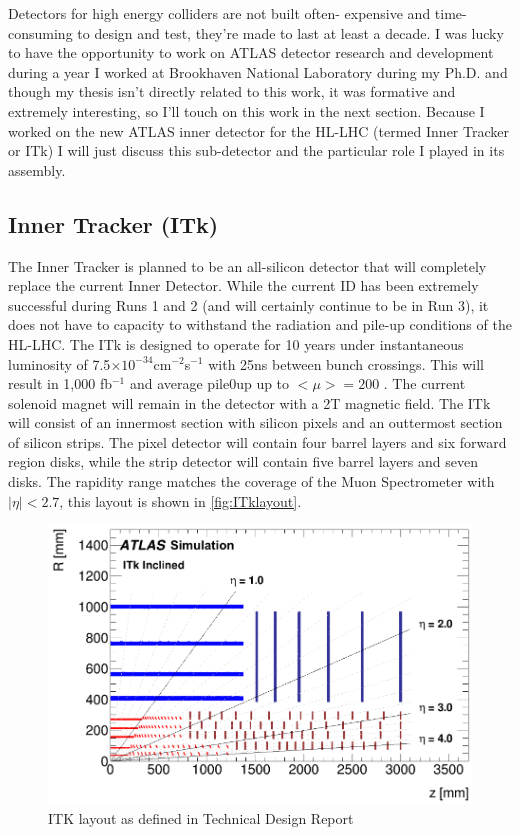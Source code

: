 Detectors for high energy colliders are not built often- expensive and time-consuming to design and test, they're made to last at least a decade. I was lucky to have the opportunity to work on ATLAS detector research and development during a year I worked at Brookhaven National Laboratory during my Ph.D. and though my thesis isn't directly related to this work, it was formative and extremely interesting, so I'll touch on this work in the next section. Because I worked on the new ATLAS inner detector for the HL-LHC (termed Inner Tracker or ITk) I will just discuss this sub-detector and the particular role I played in its assembly.

\subsection{Inner Tracker (ITk)}
The Inner Tracker is planned to be an all-silicon detector that will completely replace the current Inner Detector.  While the current ID has been extremely successful during Runs 1 and 2 (and will certainly continue to be in Run 3), it does not have to capacity to withstand the radiation and pile-up conditions of the HL-LHC. The ITk is designed to operate for 10 years under instantaneous luminosity of 7.5$\times10^{-34}$cm$^{-2}$s$^{-1}$ with 25ns between bunch crossings. This will result in 1,000 fb$^{-1}$ and average pile0up up to $<\mu>=200$ \cite{ITktech}. The current solenoid magnet will remain in the detector with a 2T magnetic field. The ITk will consist of an innermost section with silicon pixels and an outtermost section of silicon strips. The pixel detector will contain four barrel layers and six forward region disks, while the strip detector will contain five barrel layers and seven disks. The rapidity range matches the coverage of the Muon Spectrometer with $|\eta|<2.7$, this layout is shown in \ref{fig:ITklayout}. 
\begin{figure}[!h]
        \centering
    \includegraphics[width=.6\textwidth]{Pictures/ITklayout.png}
    \caption{ ITK layout as defined in Technical Design Report \cite{ITktech}}
    \label{fig:ITKlayout}
\end{figure}

